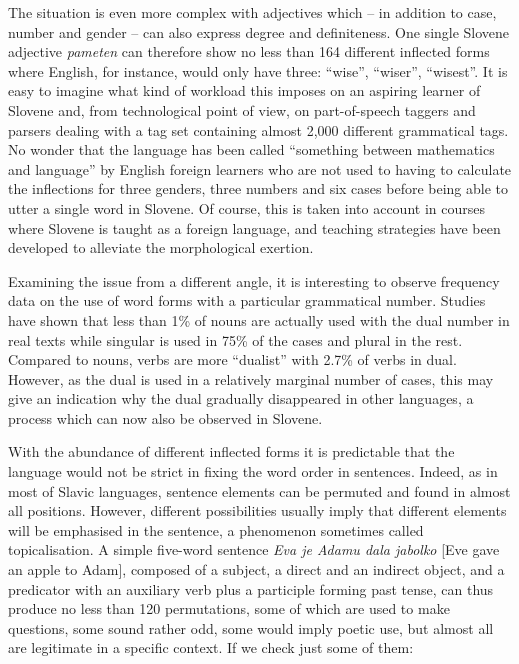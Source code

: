 \begin{multicols}{2}
The situation is even more complex with adjectives which – in addition to case, number and gender – can also express degree and definiteness. One single Slovene adjective \textit{pameten} can therefore show no less than 164 different inflected forms where English, for instance, would only have three: ``wise'', ``wiser'', ``wisest''. It is easy to imagine what kind of workload this imposes on an aspiring learner of Slovene and, from technological point of view, on part-of-speech taggers and parsers dealing with a tag set containing almost 2,000 different grammatical tags. No wonder that the language has been called ``something between mathematics and language'' by English foreign learners who are not used to having to calculate the inflections for three genders, three numbers and six cases before being able to utter a single word in Slovene. Of course, this is taken into account in courses where Slovene is taught as a foreign language, and teaching strategies have been developed to alleviate the morphological exertion.

Examining the issue from a different angle, it is interesting to observe frequency data on the use of word forms with a particular grammatical number. Studies have shown that less than 1\% of nouns are actually used with the dual number in real texts while singular is used in 75\% of the cases and plural in the rest. Compared to nouns, verbs are more ``dualist'' with 2.7\% of verbs in dual. However, as the dual is used in a relatively marginal number of cases, this may give an indication why the dual gradually disappeared in other languages, a process which can now also be observed in Slovene.


With the abundance of different inflected forms it is predictable that the language would not be strict in fixing the word order in sentences. Indeed, as in most of Slavic languages, sentence elements can be permuted and found in almost all positions. However, different possibilities usually imply that different elements will be emphasised in the sentence, a phenomenon sometimes called topicalisation. A simple five-word sentence \textit{Eva je Adamu dala jabolko} [Eve gave an apple to Adam], composed of a subject, a direct and an indirect object, and a predicator with an auxiliary verb plus a participle forming past tense, can thus produce no less than 120 permutations, some of which are used to make questions, some sound rather odd, some would imply poetic use, but almost all are legitimate in a specific context. If we check just some of them:


\end{multicols}
